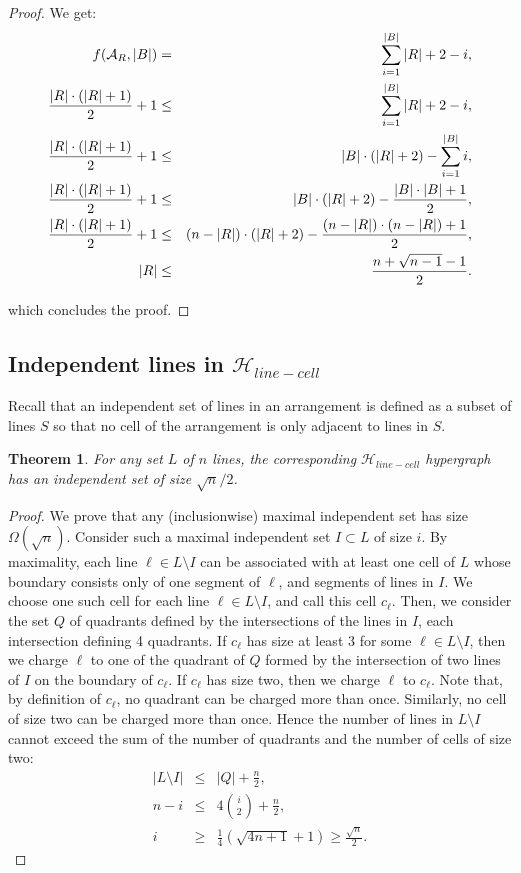 \documentclass[11pt,a4paper]{article}
\newtheorem{theorem}{Theorem}
\newcommand{\Hlinecell}{{\mathcal H}_{line-cell}}
\newcommand{\sholong}[2]{#2}
\begin{document}
\begin{proof}
We get:
\begin{eqnarray*}
f(\mathcal {A}_{R},|B|) & = & \sum_{i=1}^{|B|} |R|+2-i,\\
\sholong{}{{|R| \cdot (|R|+1) \over 2}+1 & \le & \sum_{i=1}^{|B|} |R|+2-i,\\}
{|R| \cdot (|R|+1) \over 2} +1& \le & |B| \cdot (|R|+2) - \sum_{i=1}^{|B|} i,\\
\sholong{}{{|R| \cdot (|R|+1) \over 2} +1& \le & |B| \cdot (|R|+2) - {|B|\cdot |B|+1 \over 2},\\}
{|R| \cdot (|R|+1) \over 2} +1& \le & (n-|R|) \cdot (|R|+2) - {(n-|R|)\cdot (n-|R|)+1 \over 2},\\
|R| & \le & {n+ \sqrt{n-1}-1\over 2}.
\end{eqnarray*}

\noindent which concludes the proof.
\end{proof}

\subsection{Independent lines in $\Hlinecell$}\label{sec_indep}

Recall that an independent set of lines in an arrangement is defined as a subset of lines $S$ so that no cell of the arrangement is only adjacent to lines in $S$.

\begin{theorem}\label{th:is}
For any set $L$ of $n$ lines, the corresponding $\Hlinecell$ hypergraph has an independent set of size $\sqrt{n}/2$.
\end{theorem}
\begin{proof}
We prove that any (inclusionwise) maximal independent set has size $\Omega (\sqrt{n})$. Consider such a maximal independent set $I\subset L$ of size $i$. 
By maximality, each line $\ell\in L\setminus I$ can be associated with at least one cell of $L$ whose boundary consists only of one segment of $\ell$, and segments of  lines in $I$. We choose one such cell for each line $\ell\in L\setminus I$, and call this cell $c_{\ell}$. Then, we consider the set $Q$ of quadrants defined by the intersections of the lines in $I$, each intersection defining 4 quadrants. If $c_{\ell}$ has size at least 3 for some $\ell\in L\setminus I$, then we charge $\ell$ to one of the quadrant of $Q$ formed by the intersection of two lines of $I$ on the boundary of $c_{\ell}$. If $c_{\ell}$ has size two, then we charge $\ell$ to $c_{\ell}$. Note that, by definition of $c_{\ell}$, no quadrant can be charged more than once. Similarly, no cell of size two can be charged more than once. Hence the number of lines in $L\setminus I$ cannot exceed the sum of the number of quadrants and the number of cells of size two:
\begin{eqnarray*}
|L\setminus I| & \leq & |Q| + \frac n2, \\
n - i & \leq & 4{i\choose 2} + \frac n2, \\
i & \geq & \frac 14 \left(\sqrt{4n + 1} + 1\right) \geq \frac{\sqrt{n}}2 . 
\end{eqnarray*}
\end{proof}
\end{document}
